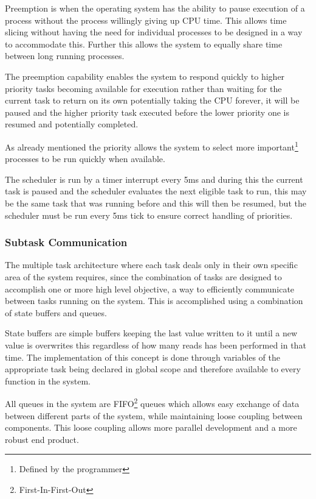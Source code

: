 \documentclass[../../../main]{subfiles}
\begin{document}
Preemption is when the operating system has the ability to pause execution of a process without the process willingly giving up CPU time. This allows time slicing without having the need for individual processes to be designed in a way to accommodate this. Further this allows the system to equally share time between long running processes.

The preemption capability enables the system to respond quickly to higher priority tasks becoming available for execution rather than waiting for the current task to return on its own potentially taking the CPU forever, it will be paused and the higher priority task executed before the lower priority one is resumed and potentially completed. 

As already mentioned the priority allows the system to select more important\footnote{Defined by the programmer} processes to be run quickly when available. 

The scheduler is run by a timer interrupt every 5ms and during this the current task is paused and the scheduler evaluates the next eligible task to run, this may be the same task that was running before and this will then be resumed, but the scheduler must be run every 5ms tick to ensure correct handling of priorities.

\subsubsection{Subtask Communication}

The multiple task architecture where  each task deals only in their own specific area of the system requires, since the combination of tasks are designed to accomplish one or more high level objective, a way to efficiently communicate between tasks running on the system.
This is accomplished using a combination of state buffers and queues.

State buffers are simple buffers keeping the last value written to it until a new value is overwrites this regardless of how many reads has been performed in that time. The implementation of this concept is done through variables of the appropriate task being declared in global scope and therefore available to every function in the system.

All queues in the system are FIFO\footnote{First-In-First-Out} queues which allows easy exchange of data between different parts of the system, while maintaining loose coupling between components. This loose coupling allows more parallel development and a more robust end product.
\end{document}
